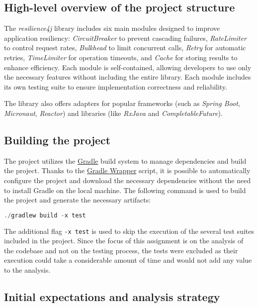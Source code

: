 \subsection{High-level overview of the project structure}

The \textit{resilience4j} library includes six main modules designed to improve application resiliency: \textit{CircuitBreaker} to prevent cascading failures, \textit{RateLimiter} to control request rates, \textit{Bulkhead} to limit concurrent calls, \textit{Retry} for automatic retries, \textit{TimeLimiter} for operation timeouts, and \textit{Cache} for storing results to enhance efficiency. Each module is self-contained, allowing developers to use only the necessary features without including the entire library. Each module includes its own testing suite to ensure implementation correctness and reliability.

The library also offers adapters for popular frameworks (such as \textit{Spring Boot}, \textit{Micronaut}, \textit{Reactor}) and libraries (like \textit{RxJava} and \textit{CompletableFuture}).

\subsection{Building the project}

The project utilizes the \href{https://gradle.org/}{Gradle} build system to manage dependencies and build the project. Thanks to the \href{https://docs.gradle.org/current/userguide/gradle_wrapper.html}{Gradle Wrapper} script, it is possible to automatically configure the project and download the necessary dependencies without the need to install Gradle on the local machine. The following command is used to build the project and generate the necessary artifacts:

\begin{lstlisting}[language=C++, caption=Building the project]
                          ./gradlew build -x test
\end{lstlisting}

\noindent The additional flag \texttt{-x test} is used to skip the execution of the several test suites included in the project. Since the focus of this assignment is on the analysis of the codebase and not on the testing process, the tests were excluded as their execution could take a considerable amount of time and would not add any value to the analysis.

\subsection{Initial expectations and analysis strategy}
\label{sec:initial_expectations}

